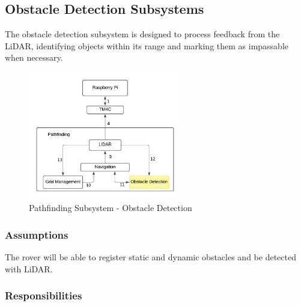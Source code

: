 \subsection{Obstacle Detection Subsystems}
The obstacle detection subsystem is designed to process feedback from the LiDAR, identifying objects within its range and marking them as impassable when necessary.
\begin{figure}[h!]
	\centering
 	\includegraphics[width=0.60\textwidth]{images/pathfinding_images/ObstacleDetection.jpeg}
 \caption{Pathfinding Subsystem - Obstacle Detection} %
\end{figure}

\subsubsection{Assumptions}
The rover will be able to register static and dynamic obstacles and be detected with LiDAR.
\subsubsection{Responsibilities}

